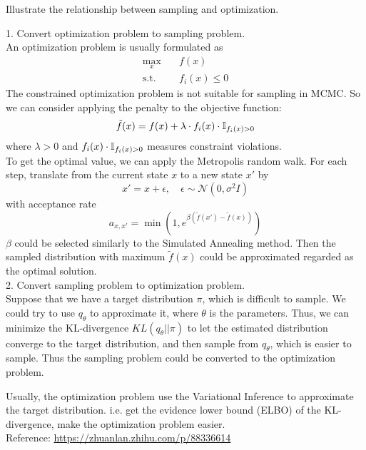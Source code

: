 \begin{homeworkProblem}

Illustrate the relationship between sampling and optimization.

\solution

1. Convert optimization problem to sampling problem. \\
An optimization problem is usually formulated as
\begin{align*}
\max_{x}  &\quad f(x) \\
\text{s.t.} &\quad f_i(x) \leq 0
\end{align*}
The constrained optimization problem is not suitable for sampling in MCMC. So we can consider applying the penalty to the objective function:
$$\tilde{f}(x) = f(x) + \lambda \cdot f_i(x)\cdot\mathbb{I}_{f_i(x) > 0}$$
where $\lambda > 0$ and $f_i(x)\cdot\mathbb{I}_{f_i(x) > 0}$ measures constraint violations. \\
To get the optimal value, we can apply the Metropolis random walk. For each step, translate from the current state $x$ to a new state $x'$ by
$$x' = x + \epsilon, \quad \epsilon \sim \mathcal{N}(0, \sigma^2 I)$$
with acceptance rate
$$a_{x,x'} = \min\left(1, e^{\beta\left(\tilde{f}(x')-\tilde{f}(x)\right)} \right)$$
$\beta$ could be selected similarly to the Simulated Annealing method. Then the sampled distribution with maximum $\tilde{f}(x)$ could be approximated regarded as the optimal solution. \\

2. Convert sampling problem to optimization problem. \\
Suppose that we have a target distribution $\pi$, which is difficult to sample. We could try to use $q_{\theta}$ to approximate it, where $\theta$ is the parameters. Thus, we can minimize the KL-divergence $KL(q_{\theta}||\pi)$ to let the estimated distribution converge to the target distribution, and then sample from $q_{\theta}$, which is easier to sample. Thus the sampling problem could be converted to the optimization problem.

Usually, the optimization problem use the Variational Inference to approximate the target distribution. i.e. get the evidence lower bound (ELBO) of the KL-divergence, make the optimization problem easier. \\

Reference: \href{https://zhuanlan.zhihu.com/p/88336614}{https://zhuanlan.zhihu.com/p/88336614}

\end{homeworkProblem}

\newpage
